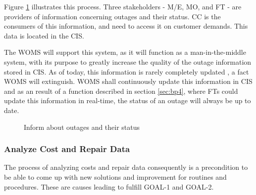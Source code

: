 Figure \ref{fig:inform} illustrates this process. Three stakeholders - M/E, MO, and FT - are providers of information concerning outages and their status. CC is the consumers of this information, and need to access it on customer demands. This data is located in the CIS. 

The WOMS will support this system, as it will function as a man-in-the-middle system, with its purpose to greatly increase the quality of the outage information stored in CIS. As of today, this information is rarely completely updated \cite{A}, a fact WOMS will extinguish. WOMS shall continuously update this information in CIS and as an result of a function described in section \ref{sec:bp4}, where FTs could update this information in real-time, the status of an outage will always be up to date. 
\begin{figure}[H]
	\centering
	\setlength\fboxsep{7pt}
	\setlength\fboxrule{0.5pt}
	\label{fig:inform}
	\caption{Inform about outages and their status}
\end{figure}
%
\subsubsection{Analyze Cost and Repair Data}
\label{sec:bp6}
The process of analyzing costs and repair data consequently is a precondition to be able to come up with new solutions and improvement for routines and procedures. These are causes leading to fulfill GOAL-1 and GOAL-2. 

